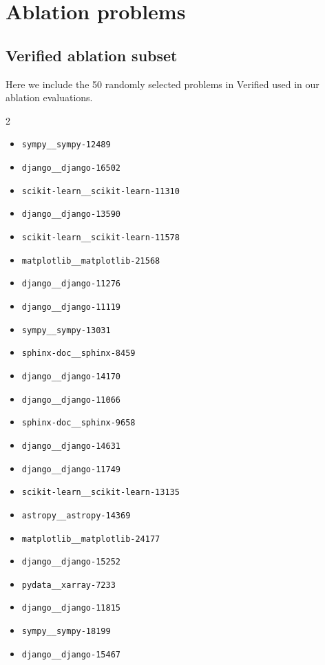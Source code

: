 \section{Ablation problems}

\subsection{\swebench Verified ablation subset}
\label{appendix:ablation_dataset}

Here we include the 50 randomly selected problems in \swebench Verified used in our ablation evaluations.

\begin{multicols}{2}
\begin{itemize}
\item \texttt{sympy\_\_sympy-12489}
\item \texttt{django\_\_django-16502}
\item \texttt{scikit-learn\_\_scikit-learn-11310}
\item \texttt{django\_\_django-13590}
\item \texttt{scikit-learn\_\_scikit-learn-11578}
\item \texttt{matplotlib\_\_matplotlib-21568}
\item \texttt{django\_\_django-11276}
\item \texttt{django\_\_django-11119}
\item \texttt{sympy\_\_sympy-13031}
\item \texttt{sphinx-doc\_\_sphinx-8459}
\item \texttt{django\_\_django-14170}
\item \texttt{django\_\_django-11066}
\item \texttt{sphinx-doc\_\_sphinx-9658}
\item \texttt{django\_\_django-14631}
\item \texttt{django\_\_django-11749}
\item \texttt{scikit-learn\_\_scikit-learn-13135}
\item \texttt{astropy\_\_astropy-14369}
\item \texttt{matplotlib\_\_matplotlib-24177}
\item \texttt{django\_\_django-15252}
\item \texttt{pydata\_\_xarray-7233}
\item \texttt{django\_\_django-11815}
\item \texttt{sympy\_\_sympy-18199}
\item \texttt{django\_\_django-15467}

\end{itemize}
\end{multicols}
